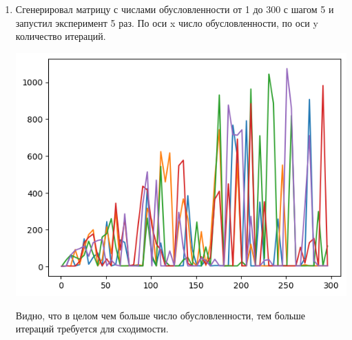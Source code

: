 \documentclass[12pt]{article}
\begin{document}
\begin{enumerate}

\item %

Сгенерировал матрицу с числами обусловленности от 1 до 300 с шагом 5 и запустил эксперимент 5 раз. По оси x число обусловленности, по оси y количество итераций.

\includegraphics{exp2/condition_numbers.png}

Видно, что в целом чем больше число обусловленности, тем больше итераций требуется для сходимости. 

\end{enumerate}
\end{document}
